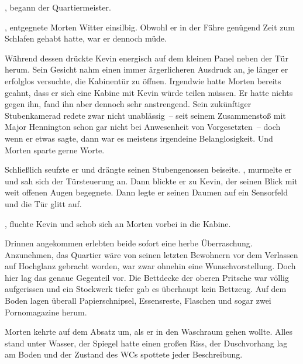 , begann der Quartiermeister.

\par

, entgegnete Morten Witter einsilbig.
Obwohl er in der Fähre genügend Zeit zum Schlafen gehabt hatte, war er dennoch müde.

\par

Während dessen drückte Kevin energisch auf dem kleinen Panel neben der Tür herum.
Sein Gesicht nahm einen immer ärgerlicheren Ausdruck an, je länger er erfolglos versuchte, die Kabinentür zu öffnen.
Irgendwie hatte Morten bereits geahnt, dass er sich eine Kabine mit Kevin würde teilen müssen.
Er hatte nichts gegen ihn, fand ihn aber dennoch sehr anstrengend.
Sein zukünftiger Stubenkamerad redete zwar nicht unablässig~-- seit seinem Zusammenstoß mit Major Hennington schon gar nicht bei Anwesenheit von Vorgesetzten~-- doch wenn er etwas sagte, dann war es meistens irgendeine Belanglosigkeit.
Und Morten sparte gerne Worte.

\par

Schließlich seufzte er und drängte seinen Stubengenossen beiseite.
, murmelte er und sah sich der Türsteuerung an.
Dann blickte er zu Kevin, der seinen Blick mit weit offenen Augen begegnete.
Dann legte er seinen Daumen auf ein Sensorfeld und die Tür glitt auf.

\par

, fluchte Kevin und schob sich an Morten vorbei in die Kabine.

\par

Drinnen angekommen erlebten beide sofort eine herbe Überraschung.
Anzunehmen, das Quartier wäre von seinen letzten Bewohnern vor dem Verlassen auf Hochglanz gebracht worden, war zwar ohnehin eine Wunschvorstellung.
Doch hier lag das genaue Gegenteil vor.
Die Bettdecke der oberen Pritsche war völlig aufgerissen und ein Stockwerk tiefer gab es überhaupt kein Bettzeug.
Auf dem Boden lagen überall Papierschnipsel, Essensreste, Flaschen und sogar zwei Pornomagazine herum.

\par

Morten kehrte auf dem Absatz um, als er in den Waschraum gehen wollte.
Alles stand unter Wasser, der Spiegel hatte einen großen Riss, der Duschvorhang lag am Boden und der Zustand des WCs spottete jeder Beschreibung.

